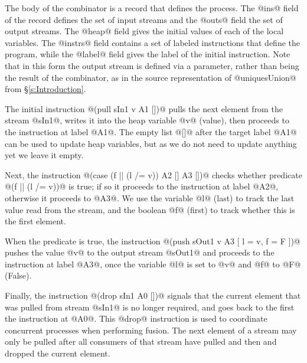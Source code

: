 The body of the combinator is a record that defines the process. The @ins@ field of the record defines the set of input streams and the @outs@ field the set of output streams. The @heap@ field gives the initial values of each of the local variables. The @instrs@ field contains a set of labeled instructions that define the program, while the @label@ field gives the label of the initial instruction. Note that in this form the output stream is defined via a parameter, rather than being the result of the combinator, as in the source representation of @uniquesUnion@ from \S\ref{s:Introduction}. 

The initial instruction @(pull sIn1 v A1 [])@ pulls the next element from the stream @sIn1@, writes it into the heap variable @v@ (value), then proceeds to the instruction at label @A1@. The empty list @[]@ after the target label @A1@ can be used to update heap variables, but as we do not need to update anything yet we leave it empty. 

Next, the instruction @(case (f || (l /= v)) A2 [] A3 [])@ checks whether predicate @(f || (l /= v))@ is true; if so it proceeds to the instruction at label @A2@, otherwise it proceeds to @A3@. We use the variable @l@ (last) to track the last value read from the stream, and the boolean @f@ (first) to track whether this is the first element.

When the predicate is true, the instruction @(push sOut1 v A3 [ l = v, f = F ])@ pushes the value @v@ to the output stream @sOut1@ and proceeds to the instruction at label @A3@, once the variable @l@ is set to @v@ and @f@ to @F@ (False).

Finally, the instruction @(drop sIn1 A0 [])@ signals that the current element that was pulled from stream @sIn1@ is no longer required, and goes back to the first the instruction at @A0@. This @drop@ instruction is used to coordinate concurrent processes when performing fusion. The next element of a stream may only be pulled after all consumers of that stream have pulled and then and dropped the current element.


